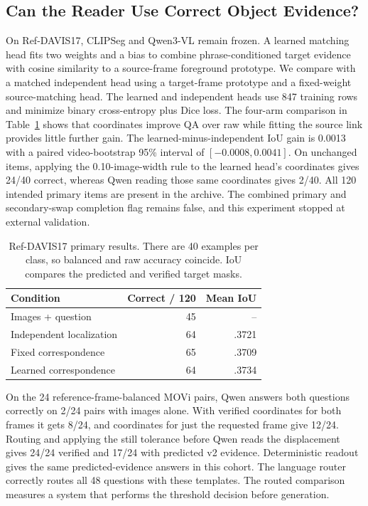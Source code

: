 \documentclass[10pt,letterpaper]{article}
\begin{document}
\subsection{Can the Reader Use Correct Object Evidence?}
On Ref-DAVIS17, CLIPSeg and Qwen3-VL remain frozen. A learned matching head fits two weights and a bias to combine phrase-conditioned target evidence with cosine similarity to a source-frame foreground prototype. We compare with a matched independent head using a target-frame prototype and a fixed-weight source-matching head. The learned and independent heads use 847 training rows and minimize binary cross-entropy plus Dice loss. The four-arm comparison in Table~\ref{tab:davis} shows that coordinates improve QA over raw while fitting the source link provides little further gain. The learned-minus-independent IoU gain is 0.0013 with a paired video-bootstrap 95\% interval of $[-0.0008,0.0041]$. On unchanged items, applying the 0.10-image-width rule to the learned head's coordinates gives 24/40 correct, whereas Qwen reading those same coordinates gives 2/40. All 120 intended primary items are present in the archive. The combined primary and secondary-swap completion flag remains false, and this experiment stopped at external validation.
\begin{table}[t]
\centering\small
\caption{Ref-DAVIS17 primary results. There are 40 examples per class, so balanced and raw accuracy coincide. IoU compares the predicted and verified target masks.}
\label{tab:davis}
\begin{tabular}{lrr}
\toprule
Condition & Correct / 120 & Mean IoU \\
\midrule
Images + question & 45 & -- \\
Independent localization & 64 & .3721 \\
Fixed correspondence & 65 & .3709 \\
Learned correspondence & 64 & .3734 \\
\bottomrule
\end{tabular}
\end{table}

On the 24 reference-frame-balanced MOVi pairs, Qwen answers both questions correctly on 2/24 pairs with images alone. With verified coordinates for both frames it gets 8/24, and coordinates for just the requested frame give 12/24. Routing and applying the still tolerance before Qwen reads the displacement gives 24/24 verified and 17/24 with predicted v2 evidence. Deterministic readout gives the same predicted-evidence answers in this cohort. The language router correctly routes all 48 questions with these templates. The routed comparison measures a system that performs the threshold decision before generation.
\end{document}
